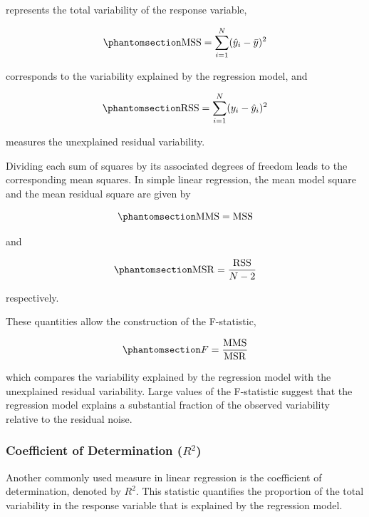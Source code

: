 \documentclass[
  12pt,
  letterpaper,
]{book}
\begin{document}
represents the total variability of the response variable,

\begin{equation}\phantomsection\label{eq-mss}{
\mathrm{MSS}
=
\sum_{i=1}^{N}
(\hat{y}_i - \bar{y})^2
}\end{equation}

corresponds to the variability explained by the regression model, and

\begin{equation}\phantomsection\label{eq-rss-anova}{
\mathrm{RSS}
=
\sum_{i=1}^{N}
(y_i - \hat{y}_i)^2
}\end{equation}

measures the unexplained residual variability.

Dividing each sum of squares by its associated degrees of freedom leads
to the corresponding mean squares. In simple linear regression, the mean
model square and the mean residual square are given by

\begin{equation}\phantomsection\label{eq-mms}{
\mathrm{MMS}
=
\mathrm{MSS}
}\end{equation}

and

\begin{equation}\phantomsection\label{eq-msr}{
\mathrm{MSR}
=
\frac{
\mathrm{RSS}
}{
N - 2
}
}\end{equation}

respectively.

These quantities allow the construction of the F-statistic,

\begin{equation}\phantomsection\label{eq-f-statistic}{
F
=
\frac{
\mathrm{MMS}
}{
\mathrm{MSR}
}
}\end{equation}

which compares the variability explained by the regression model with
the unexplained residual variability. Large values of the F-statistic
suggest that the regression model explains a substantial fraction of the
observed variability relative to the residual noise.

\subsubsection{\texorpdfstring{Coefficient of Determination
(\(R^2\))}{Coefficient of Determination (R\^{}2)}}\label{coefficient-of-determination-r2}

Another commonly used measure in linear regression is the coefficient of
determination, denoted by \(R^2\). This statistic quantifies the
proportion of the total variability in the response variable that is
explained by the regression model.
\end{document}

